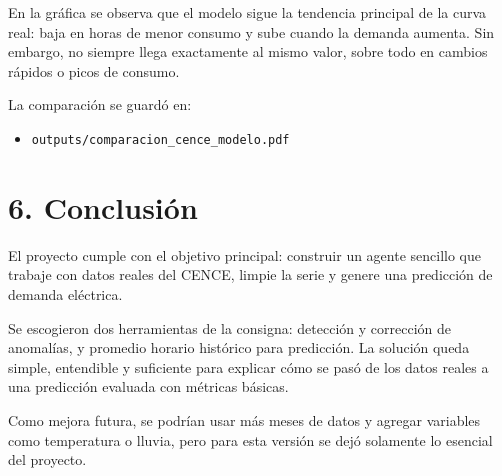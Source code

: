 \documentclass[11pt]{article}
\begin{document}
En la gráfica se observa que el modelo sigue la tendencia principal de la curva real: baja en horas de menor consumo y sube cuando la demanda aumenta. Sin embargo, no siempre llega exactamente al mismo valor, sobre todo en cambios rápidos o picos de consumo.

La comparación se guardó en:

\begin{itemize}
  \item \texttt{outputs/comparacion\_cence\_modelo.pdf}
\end{itemize}

\section*{6. Conclusión}

El proyecto cumple con el objetivo principal: construir un agente sencillo que trabaje con datos reales del CENCE, limpie la serie y genere una predicción de demanda eléctrica.

Se escogieron dos herramientas de la consigna: detección y corrección de anomalías, y promedio horario histórico para predicción. La solución queda simple, entendible y suficiente para explicar cómo se pasó de los datos reales a una predicción evaluada con métricas básicas.

Como mejora futura, se podrían usar más meses de datos y agregar variables como temperatura o lluvia, pero para esta versión se dejó solamente lo esencial del proyecto.
\end{document}
